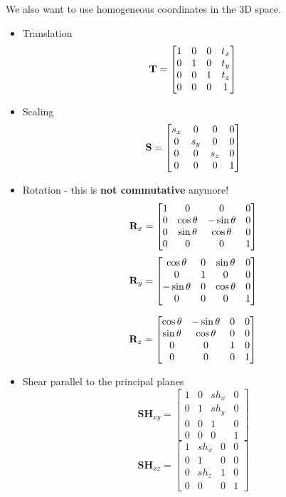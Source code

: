 We also want to use homogeneous coordinates in the 3D space. 
\begin{itemize}
	\item Translation	
	$$\textbf T = \begin{bmatrix}
		1 & 0 & 0 & t_x \\ 0 & 1 & 0 & t_y \\ 0 & 0 & 1 & t_z \\ 0 & 0 & 0 & 1
	\end{bmatrix}$$
	
	\item Scaling
	$$\textbf S = \begin{bmatrix}
		s_x & 0 & 0 & 0 \\ 0 & s_y & 0 & 0 \\ 0 & 0 & s_z & 0 \\ 0 & 0 & 0 & 1
	\end{bmatrix}$$
	
	\item Rotation - this is \textbf{not commutative} anymore!
	$$\textbf R_x = \begin{bmatrix}
		1 & 0 & 0 & 0 \\ 0 & \cos \theta & - \sin \theta & 0 \\ 0 & \sin \theta & \cos \theta & 0 \\ 0 & 0 & 0 & 1
	\end{bmatrix}$$
	$$\textbf R_y = \begin{bmatrix}
		\cos \theta & 0 & \sin \theta & 0 \\ 0 & 1 & 0 & 0 \\ -\sin \theta & 0 & \cos \theta & 0 \\ 0 & 0 & 0 & 1
	\end{bmatrix}$$
	
	$$\textbf R_z = \begin{bmatrix}
		\cos \theta & - \sin \theta & 0 & 0 \\ \sin \theta & \cos \theta & 0 & 0 \\ 0 & 0 & 1 & 0 \\ 0 & 0 & 0 & 1
	\end{bmatrix}$$
	
	\item Shear parallel to the principal planes
	$$\textbf{SH}_{xy} = \begin{bmatrix}
		1 & 0 & sh_x & 0\\ 0 & 1 & sh_y & 0 \\ 0 & 0 & 1 & 0 \\ 0 & 0 & 0 & 1
	\end{bmatrix}$$
	$$\textbf{SH}_{xz} = \begin{bmatrix}
		1 & sh_x & 0 & 0\\ 0 & 1 & 0 & 0 \\ 0 & sh_z & 1 & 0 \\ 0 & 0 & 0 & 1
	\end{bmatrix}$$
	

\end{itemize}
